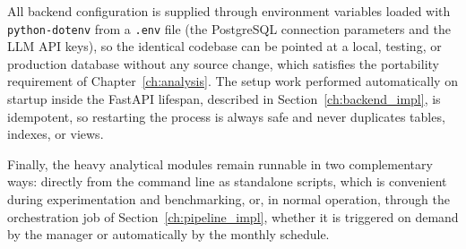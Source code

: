All backend configuration is supplied through environment variables loaded with \texttt{python-dotenv} from a \texttt{.env} file (the PostgreSQL connection parameters and the LLM API keys), so the identical codebase can be pointed at a local, testing, or production database without any source change, which satisfies the portability requirement of Chapter~\ref{ch:analysis}. The setup work performed automatically on startup inside the FastAPI lifespan, described in Section~\ref{ch:backend_impl}, is idempotent, so restarting the process is always safe and never duplicates tables, indexes, or views.

Finally, the heavy analytical modules remain runnable in two complementary ways: directly from the command line as standalone scripts, which is convenient during experimentation and benchmarking, or, in normal operation, through the orchestration job of Section~\ref{ch:pipeline_impl}, whether it is triggered on demand by the manager or automatically by the monthly schedule.